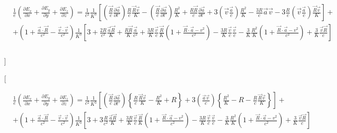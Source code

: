 \documentclass[11pt]{article}
\begin{document}
\begin{align}
  & \frac{1}{e}\left( \frac{\partial {{E}_{x}}}{\partial x}+\frac{\partial {{E}_{y}}}{\partial y}+\frac{\partial {{E}_{z}}}{\partial z} \right)=\frac{1}{{{c}^{2}}}\frac{1}{{{K}^{3}}}\left[ \left( \frac{\overrightarrow{R}}{c}\frac{\partial \overrightarrow{a}}{\partial t'} \right)\frac{R}{c}\frac{\overrightarrow{R}\overrightarrow{v}}{K}-\left( \frac{\overrightarrow{R}}{c}\frac{\partial \overrightarrow{a}}{\partial t'} \right)\frac{{{R}^{2}}}{K}+\frac{R\overrightarrow{R}}{c}\frac{\partial \overrightarrow{a}}{\partial t'}+3\left( \overrightarrow{v}\frac{\overrightarrow{a}}{c} \right)\frac{{{R}^{2}}}{K}-\frac{3R}{c}\overrightarrow{a}\overrightarrow{v}-3\frac{R}{c}\left( \overrightarrow{v}\frac{\overrightarrow{a}}{c} \right)\frac{\overrightarrow{R}\overrightarrow{v}}{K} \right]+ \\ 
 & +\left( 1+\frac{\overrightarrow{a}\cdot \overrightarrow{R}}{{{c}^{2}}}-\frac{\overrightarrow{v}\cdot \overrightarrow{v}}{{{c}^{2}}} \right)\frac{1}{{{K}^{3}}}\left[ 3+\frac{2R}{{{c}^{2}}}\frac{\overrightarrow{a}\overrightarrow{R}}{K}+\frac{R\overrightarrow{R}}{K}\frac{\overrightarrow{a}}{{{c}^{2}}}+\frac{3R}{K}\frac{\overrightarrow{v}}{c}\frac{\overrightarrow{R}}{K}\left( 1+\frac{\overrightarrow{R}\cdot \overrightarrow{a}-{{v}^{2}}}{{{c}^{2}}} \right)-\frac{3R}{K}\frac{\overrightarrow{v}}{c}\frac{\overrightarrow{v}}{c}-\frac{3}{K}\frac{{{R}^{2}}}{K}\left( 1+\frac{\overrightarrow{R}\cdot \overrightarrow{a}-{{v}^{2}}}{{{c}^{2}}} \right)+\frac{3}{K}\frac{\overrightarrow{v}\overrightarrow{R}}{c} \right] \\ 
 &  \\ 
\end{align}

{]}

{[}

\begin{align}
  & \frac{1}{e}\left( \frac{\partial {{E}_{x}}}{\partial x}+\frac{\partial {{E}_{y}}}{\partial y}+\frac{\partial {{E}_{z}}}{\partial z} \right)=\frac{1}{{{c}^{2}}}\frac{1}{{{K}^{3}}}\left[ \left( \frac{\overrightarrow{R}}{c}\frac{\partial \overrightarrow{a}}{\partial t'} \right)\left\{ \frac{R}{c}\frac{\overrightarrow{R}\overrightarrow{v}}{K}-\frac{{{R}^{2}}}{K}+R \right\}+3\left( \frac{\overrightarrow{a}\overrightarrow{v}}{c} \right)\left\{ \frac{{{R}^{2}}}{K}-R-\frac{R}{c}\frac{\overrightarrow{R}\overrightarrow{v}}{K} \right\} \right]+ \\ 
 & +\left( 1+\frac{\overrightarrow{a}\cdot \overrightarrow{R}}{{{c}^{2}}}-\frac{\overrightarrow{v}\cdot \overrightarrow{v}}{{{c}^{2}}} \right)\frac{1}{{{K}^{3}}}\left[ 3+3\frac{R}{{{c}^{2}}}\frac{\overrightarrow{a}\overrightarrow{R}}{K}+\frac{3R}{K}\frac{\overrightarrow{v}}{c}\frac{\overrightarrow{R}}{K}\left( 1+\frac{\overrightarrow{R}\cdot \overrightarrow{a}-{{v}^{2}}}{{{c}^{2}}} \right)-\frac{3R}{K}\frac{\overrightarrow{v}}{c}\frac{\overrightarrow{v}}{c}-\frac{3}{K}\frac{{{R}^{2}}}{K}\left( 1+\frac{\overrightarrow{R}\cdot \overrightarrow{a}-{{v}^{2}}}{{{c}^{2}}} \right)+\frac{3}{K}\frac{\overrightarrow{v}\overrightarrow{R}}{c} \right] \\ 
 &  \\ 
\end{align}
\end{document}
